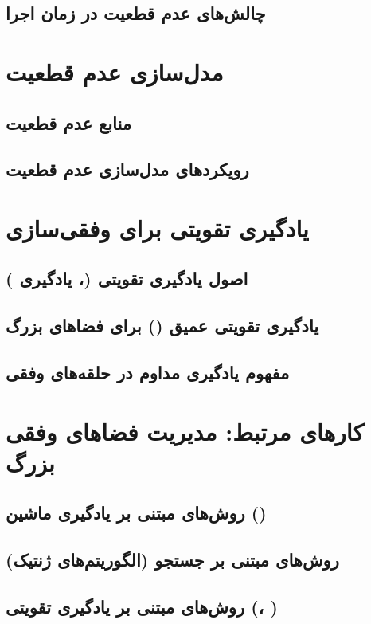 \documentclass[oneside,openany,phd]{TMU-Thesis}
\begin{document}
\subsection{چالش‌های عدم قطعیت در زمان اجرا}

\section{مدل‌سازی عدم قطعیت}
\subsection{منابع عدم قطعیت}
\subsection{رویکردهای مدل‌سازی عدم قطعیت}

\section{یادگیری تقویتی برای وفقی‌سازی}
\subsection{اصول یادگیری تقویتی (، یادگیری )}
\subsection{یادگیری تقویتی عمیق () برای فضاهای بزرگ}
\subsection{مفهوم یادگیری مداوم در حلقه‌های وفقی}

\section{کارهای مرتبط: مدیریت فضاهای وفقی بزرگ}
\subsection{روش‌های مبتنی بر یادگیری ماشین ()}
\subsection{روش‌های مبتنی بر جستجو (الگوریتم‌های ژنتیک)}
\subsection{روش‌های مبتنی بر یادگیری تقویتی (، )}
\end{document}
